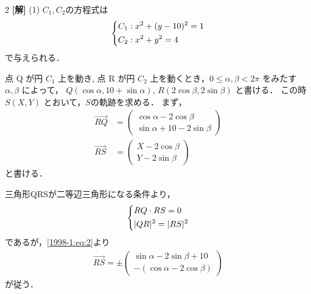 \documentclass[../../../../main.tex]{subfiles}
\begin{document}
\setcounter{equation}{0}
\begin{oframed}
    
\end{oframed}
\setlength{\columnseprule}{0.4pt}
\begin{multicols}{2}
    {\bf[解]}
    (1)
    $C_1,C_2$の方程式は
    \begin{align*}
        \begin{dcases}
            C_1 : x^2 + (y-10)^2=1 \\
            C_2 : x^2 + y^2 = 4
        \end{dcases}
    \end{align*}
    で与えられる．

    点 Q が円 $C_1$ 上を動き, 点 R が円 $C_2$ 上を動くとき，$0 \le \alpha, \beta < 2\pi$ をみたす $\alpha, \beta$ によって，
    $Q(\cos\alpha, 10+\sin\alpha)$, $R(2\cos\beta, 2\sin\beta)$ と書ける．
    この時$S(X, Y)$ とおいて，$S$の軌跡を求める．
    まず，
    \begin{align}
        \overrightarrow{RQ} & = \begin{pmatrix} \cos\alpha - 2\cos\beta \\ \sin\alpha +10 - 2\sin\beta \end{pmatrix}\label{1998-1:eq:2} \\
        \overrightarrow{RS} & = \begin{pmatrix} X-2\cos\beta \\ Y-2\sin\beta \end{pmatrix} \label{1998-1:eq:3}
    \end{align}
    と書ける．

    三角形QRSが二等辺三角形になる条件より，
    \begin{align*}
        \begin{dcases}
            RQ \cdot RS = 0 \\
            |QR|^2 = |RS|^2
        \end{dcases}
    \end{align*}
    であるが，\cref{1998-1:eq:2}より
    \begin{align*}
        \overrightarrow{RS} = \pm \begin{pmatrix} \sin\alpha - 2\sin\beta + 10 \\ -(\cos\alpha - 2\cos\beta) \end{pmatrix}
    \end{align*}
    が従う．


\end{multicols}
\end{document}
